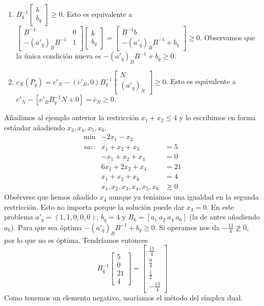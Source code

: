 \documentclass[PM.tex]{subfiles}
\begin{document}
\begin{enumerate}
\item $B_q^{-1}\begin{bmatrix}
b\\
b_q
\end{bmatrix}\geq 0$. Esto es equivalente a $\begin{bmatrix}
B^{-1} & 0\\
-(a'_q)_B B^{-1} & 1
\end{bmatrix}\begin{bmatrix}
b\\
b_q
\end{bmatrix}=\begin{bmatrix}
B^{-1}b\\
-(a'_q)_B B^{-1}+b_q
\end{bmatrix}\geq 0$. Observamos que la única condición nueva es $-(a'_q)_B B^{-1}+b_q\geq 0$.
\item $\overline{c}_N(P_q)=c'_N-(c'_B,0)B_q^{-1}\begin{bmatrix}
N\\
(a'_q)_N
\end{bmatrix}\geq 0$. Esto es equivalente a $c'_N-[c'_B B_q^{-1} N + 0]=\overline{c}_N\geq 0$.
\end{enumerate}

\begin{example}
Añadimos al ejemplo anterior la restricción $x_1+x_2\leq 4$ y lo escribimos en forma estándar añadiendo $x_3,x_4,x_5,x_6$.
\begin{align*}
\min & -2x_1-x_2 &\\
sa: & x_1+x_2 +x_3 &= 5\\
    & -x_1+x_2 +x_4 & =0\\
    & 6x_1+2x_2  +x_4 & = 21\\
    & x_1+x_2 +x_6  & = 4\\
    & x_1,x_2,x_3,x_4,x_5,x_6 & \geq 0
\end{align*}
Obsérvese que hemos añadido $x_4$ aunque ya teníamos una igualdad en la segunda restricción. Esto no importa porque la solución puede dar $x_4=0$. En este problema $a'_q=(1,1,0,0,0)$, $b_q=4$ y $B_6=[a_1\ a_2\ a_4\ a_6]$ (la de antes añadiendo $a_6$). Para que sea óptima $-(a'_q)_B B^{-1}+b_q\geq 0$. Si operamos nos da $-\frac{13}{4}\not\geq 0$, por lo que no es óptima. Tendríamos entonces
\[ B_q^{-1}\begin{bmatrix}
5\\
0\\
21\\
4
\end{bmatrix}=\begin{bmatrix}
\frac{11}{4}\\
\frac{9}{4}\\
\frac{1}{2	}\\
-\frac{13}{4}
\end{bmatrix}\]
Como tenemos un elemento negativo, usaríamos el método del símplex dual.
\end{example}
\end{document}
